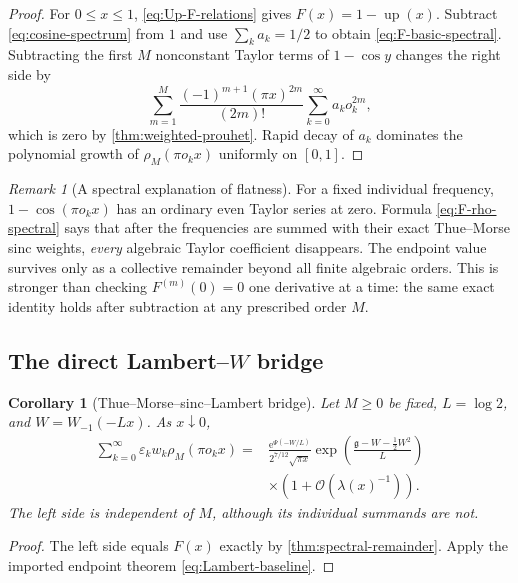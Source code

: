 \documentclass[11pt,oneside]{article}
\newtheorem{corollary}[theorem]{Corollary}
\theoremstyle{definition}
\theoremstyle{remark}
\newtheorem{remark}[theorem]{Remark}
\newcommand{\Up}{\operatorname{up}}
\newcommand{\e}{\mathrm e}
\newcommand{\bigO}{\mathcal O}
\newcommand{\eps}{\varepsilon}
\begin{document}
\begin{proof}
For $0\le x\le1$, \eqref{eq:Up-F-relations} gives
$F(x)=1-\Up(x)$.  Subtract \eqref{eq:cosine-spectrum} from $1$ and use
$\sum_ka_k=1/2$ to obtain \eqref{eq:F-basic-spectral}.  Subtracting the first
$M$ nonconstant Taylor terms of $1-\cos y$ changes the right side by
\[
 \sum_{m=1}^{M}\frac{(-1)^{m+1}(\pi x)^{2m}}{(2m)!}
 \sum_{k=0}^{\infty}a_ko_k^{2m},
\]
which is zero by \cref{thm:weighted-prouhet}.  Rapid decay of $a_k$ dominates
the polynomial growth of $\rho_M(\pi o_kx)$ uniformly on $[0,1]$.
\end{proof}

\begin{remark}[A spectral explanation of flatness]
For a fixed individual frequency, $1-\cos(\pi o_kx)$ has an ordinary even
Taylor series at zero.  Formula \eqref{eq:F-rho-spectral} says that after the
frequencies are summed with their exact Thue--Morse sinc weights, \emph{every}
algebraic Taylor coefficient disappears.  The endpoint value survives only as
a collective remainder beyond all finite algebraic orders.  This is stronger
than checking $F^{(m)}(0)=0$ one derivative at a time: the same exact identity
holds after subtraction at any prescribed order $M$.
\end{remark}

\subsection{The direct Lambert--\texorpdfstring{$W$}{W} bridge}

\begin{corollary}[Thue--Morse--sinc--Lambert bridge]\label{cor:Lambert-spectral-bridge}
Let $M\ge0$ be fixed, $L=\log2$, and
$W=W_{-1}(-Lx)$.  As $x\downarrow0$,
\begin{equation}\label{eq:Lambert-spectral-bridge}
\boxed{
\begin{aligned}
 \sum_{k=0}^{\infty}\eps_kw_k\rho_M(\pi o_kx)
 ={}&\frac{\e^{\Psi(-W/L)}}{2^{7/12}\sqrt{\pi x}}
 \exp\!\left(\frac{\mathfrak g-W-\tfrac12W^2}{L}\right)\\
 &\times\left(1+\bigO\!\left(\lambda(x)^{-1}\right)\right).
\end{aligned}}
\end{equation}
The left side is independent of $M$, although its individual summands are not.
\end{corollary}

\begin{proof}
The left side equals $F(x)$ exactly by
\cref{thm:spectral-remainder}.  Apply the imported endpoint theorem
\eqref{eq:Lambert-baseline}.
\end{proof}
\end{document}
